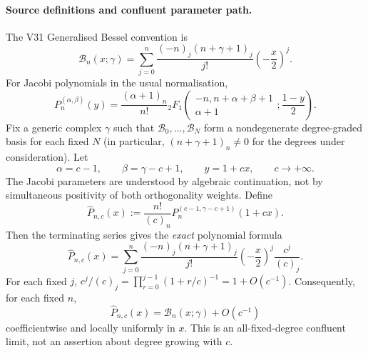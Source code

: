 \documentclass[11pt]{article}
\begin{document}
\paragraph{Source definitions and confluent parameter path.}
The V31 Generalised Bessel convention is
\begin{equation}\label{eq:v133-gb-def}
 \mathcal{B}_n(x;\gamma)=\sum_{j=0}^n
 \frac{(-n)_j(n+\gamma+1)_j}{j!}\left(-\frac{x}{2}\right)^j.
\end{equation}
For Jacobi polynomials in the usual normalisation,
\begin{equation}\label{eq:v133-jac-def}
 P_n^{(\alpha,\beta)}(y)=\frac{(\alpha+1)_n}{n!}
 {}_2F_1\!\left(\begin{matrix}-n,n+\alpha+\beta+1\\\alpha+1\end{matrix};\frac{1-y}{2}\right).
\end{equation}
Fix a generic complex $\gamma$ such that $\mathcal{B}_0,\ldots,\mathcal{B}_N$
form a nondegenerate degree-graded basis for each fixed $N$ (in particular,
$(n+\gamma+1)_n\ne0$ for the degrees under consideration).  Let
\begin{equation}\label{eq:v133-path}
 \alpha=c-1,\qquad \beta=\gamma-c+1,\qquad y=1+cx,
 \qquad c\longrightarrow+\infty.
\end{equation}
The Jacobi parameters are understood by algebraic continuation, not by
simultaneous positivity of both orthogonality weights. Define
\begin{equation}\label{eq:v133-normalization}
 \widehat P_{n,c}(x):=\frac{n!}{(c)_n}
 P_n^{(c-1,\gamma-c+1)}(1+cx).
\end{equation}
Then the terminating series gives the \emph{exact} polynomial formula
\begin{equation}\label{eq:v133-exact}
 \widehat P_{n,c}(x)
 =\sum_{j=0}^n \frac{(-n)_j(n+\gamma+1)_j}{j!}
 \left(-\frac{x}{2}\right)^j\frac{c^j}{(c)_j}.
\end{equation}
For each fixed $j$, $c^j/(c)_j=\prod_{r=0}^{j-1}(1+r/c)^{-1}
=1+O(c^{-1})$. Consequently, for each fixed $n$,
\begin{equation}\label{eq:v133-limit}
 \boxed{\widehat P_{n,c}(x)=\mathcal{B}_n(x;\gamma)+O(c^{-1})}
\end{equation}
coefficientwise and locally uniformly in $x$. This is an all-fixed-degree
confluent limit, not an assertion about degree growing with $c$.
\end{document}
